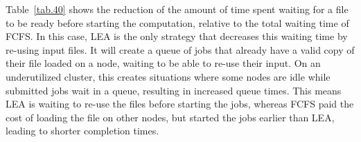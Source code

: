 \documentclass[conference]{IEEEtran}
\newcommand{\us}{\ensuremath{\mathit{user~session}}\xspace}
\newcommand{\rev}[1]{{\color{black}{#1}}}
\begin{document}
\begin{table}
\caption{Percentage of reduction in data transfer time relative to FCFS at week 40.}\label{tab.40}
\end{table}

Table~\ref{tab.40} shows the reduction of the amount of time spent 
waiting for a file to be ready before starting the computation,
relative to the total waiting time of FCFS.
In this case, LEA is the only strategy that decreases this waiting time by re-using input files.
It will create a queue of jobs that already have a valid copy of their file loaded on a node, waiting to be able to re-use their input.
On an underutilized cluster, this creates situations where some nodes are idle while submitted jobs wait in a queue,
resulting in increased queue times.
This means LEA is waiting to re-use the files before starting the jobs,
whereas FCFS paid the cost of loading the file on other nodes, but started the jobs
earlier than LEA, leading to shorter completion times.
\end{document}
